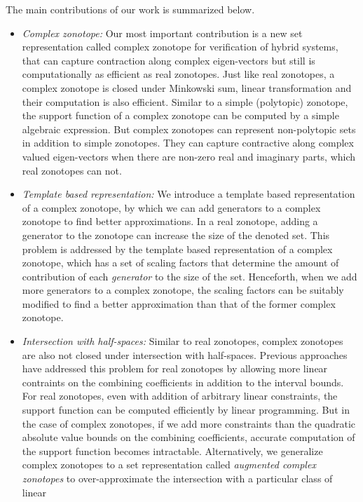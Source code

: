 The main contributions of our work is summarized below.
%
\begin{itemize}
\item \emph{Complex zonotope: } Our most important contribution is a
  new set representation called complex zonotope for verification of
  hybrid systems, that can capture contraction along complex
  eigen-vectors but still is computationally as efficient as real
  zonotopes.  Just like real zonotopes, a complex zonotope is closed
  under Minkowski sum, linear transformation and their computation is
  also efficient.  Similar to a simple (polytopic) zonotope, the
  support function of a complex zonotope can be computed by a simple
  algebraic expression.  But complex zonotopes can represent
  non-polytopic sets in addition to simple zonotopes.  They can
  capture contractive along complex valued eigen-vectors when there
  are non-zero real and imaginary parts, which real zonotopes can not.
\item \emph{Template based representation: }  We introduce a template
  based representation of a complex zonotope, by which we can
  add generators to a complex zonotope to find better approximations.
  In a real zonotope, adding a generator to the zonotope can increase
  the size of the denoted set.  This problem is addressed by the
  template based representation of a complex zonotope, which has a set
  of scaling factors that determine the amount of contribution of each
  \emph{generator} to the size of the set.  Henceforth, when we add
  more generators to a complex zonotope, the scaling factors can be
  suitably modified to find a better approximation than that of the
  former complex zonotope.
\item \emph{Intersection with half-spaces: } Similar to real
  zonotopes, complex zonotopes are also not closed under intersection
  with half-spaces.  Previous
  approaches~\cite{scott2016constrained,Ghorbal2010} have addressed
  this problem for real zonotopes by allowing more linear contraints
  on the combining coefficients in addition to the interval bounds.
  For real zonotopes, even with addition of arbitrary linear
  constraints, the support function can be computed efficiently by
  linear programming.  But in the case of complex zonotopes, if we add
  more constraints than the quadratic absolute value bounds on the
  combining coefficients, accurate computation of the support function
  becomes intractable.  Alternatively, we generalize complex zonotopes
  to a set representation called \emph{augmented complex zonotopes} to
  over-approximate the intersection with a particular class of linear

\end{itemize}
